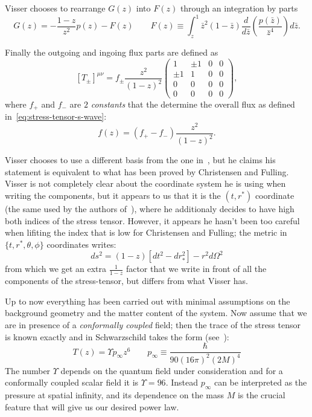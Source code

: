 Visser chooses to rearrange \(G(z)\) into \(F(z)\) through an integration by parts
\[
G(z) = - \frac{1 - z}{z^2}p(z) - F(z) \quad \quad F(z) \equiv \int_z^1 \bar{z}^2(1 - \bar{z})\frac{d}{d\bar{z}}\left(\frac{p(\bar{z})}{\bar{z}^4}\right) d\bar{z}.   
\]

Finally the outgoing and ingoing flux parts are defined as 
\[
    \left[T_{\pm}\right]^{\mu\nu} = f_{\pm} \frac{z^2}{(1 - z)^2}
    \begin{pmatrix}
        1 & \pm 1 & 0 & 0 \\
        \pm 1 & 1 & 0 & 0 \\
        0 & 0 & 0 & 0 \\
        0 & 0 & 0 & 0
    \end{pmatrix},
\]
where \(f_+\) and \(f_-\) are \(2\) \emph{constants} that the determine the overall flux as defined in~\eqref{eq:stress-tensor-s-wave}:
\[
f(z) = \left(f_+ - f_-\right) \frac{z^2}{(1 - z)^2}. 
\]
\begin{remark}
    Visser chooses to use a different basis from the one  in~\cite[]{christensen1977trace}, but he claims his statement is equivalent to what has been proved by Christensen and Fulling. Visser is not completely clear about the coordinate system he is using when writing the components, but it appears to us that it is the \((t, r^*)\) coordinate (the same used by the authors of~\cite[]{christensen1977trace}), where he additionaly decides to have high both indices of the stress tensor. However, it appears he hasn't been too careful when lifiting the index that is low for Christensen and Fulling; the metric in \(\{t, r^*, \theta, \phi\}\) coordinates writes:
    \[
    ds^2 = (1 - z) \left[dt^2 - dr_*^2\right]  -r^2d\Omega^2  
    \]
    from which we get an extra \(\frac{1}{1-z}\) factor that we write in front of all the components of the stress-tensor, but differs from what Visser has.
\end{remark}

Up to now everything has been carried out with minimal assumptions on the background geometry and the matter content of the system. Now assume that we are in presence of a \emph{conformally coupled} field; then the trace of the stress tensor is known exactly and in Schwarzschild takes the form (see~\cite{birrell1984quantum}):
\[
T(z) = \Upsilon p_{\infty}z^6 \quad \quad p_{\infty} \equiv \frac{\hbar}{90(16\pi)^2(2M)^4}   
\]
The number \(\Upsilon\) depends on the quantum field under consideration and for a conformally coupled scalar field it is \(\Upsilon = 96\). Instead \(p_{\infty}\) can be interpreted as the pressure at spatial infinity, and its dependence on the mass \(M\) is the crucial feature that will give us our desired power law.

